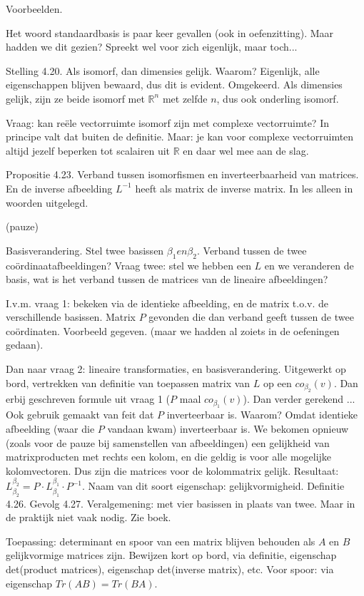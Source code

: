 \documentclass{article}
\begin{document}
Voorbeelden. 

Het woord standaardbasis is paar keer gevallen (ook in oefenzitting). Maar hadden we dit gezien? Spreekt wel voor zich eigenlijk, maar toch... 

Stelling 4.20. Als isomorf, dan dimensies gelijk. Waarom? Eigenlijk, alle eigenschappen blijven bewaard, dus dit is evident. Omgekeerd. Als dimensies gelijk, zijn ze beide isomorf met $\mathbb{R}^n$ met zelfde $n$, dus ook onderling isomorf. 

Vraag: kan re\"ele vectorruimte isomorf zijn met complexe vectorruimte? In principe valt dat buiten de definitie. Maar: je kan voor complexe vectorruimten altijd jezelf beperken tot scalairen uit $\mathbb{R}$ en daar wel mee aan de slag.

Propositie 4.23. Verband tussen isomorfismen en inverteerbaarheid van matrices. En de inverse afbeelding $L^{-1}$ heeft als matrix de inverse matrix. In les alleen in woorden uitgelegd. 

(pauze) 

Basisverandering. Stel twee basissen $\beta_1 en \beta_2$. Verband tussen de twee co\-\"or\-di\-naat\-afbeeldingen? Vraag twee: stel we hebben een $L$ en we veranderen de basis, wat is het verband tussen de matrices van de lineaire afbeeldingen? 

I.v.m. vraag 1: bekeken via de identieke afbeelding, en de matrix t.o.v. de verschillende basissen. Matrix $P$ gevonden die dan verband geeft tussen de twee co\"ordinaten. Voorbeeld gegeven. (maar we hadden al zoiets in de oefeningen gedaan). 

Dan naar vraag 2: lineaire transformaties, en basisverandering. Uitgewerkt op bord, vertrekken van definitie van toepassen matrix van $L$ op een $co_{\beta_2}(v)$. Dan erbij geschreven formule uit vraag 1 ($P$ maal $co_{\beta_1}(v)$). Dan verder gerekend ... Ook gebruik gemaakt van feit dat $P$ inverteerbaar is. Waarom? Omdat identieke afbeelding (waar die $P$ vandaan kwam) inverteerbaar is. We bekomen opnieuw (zoals voor de pauze bij samenstellen van afbeeldingen) een gelijkheid van matrixproducten met rechts een kolom, en die geldig is voor alle mogelijke kolomvectoren. Dus zijn die matrices voor de kolommatrix gelijk. Resultaat: $L_{\beta_2}^{\beta_2}  = P \cdot L_{\beta_1}^{\beta_1} \cdot P^{-1}$. Naam van dit soort eigenschap: gelijkvormigheid. Definitie 4.26. Gevolg 4.27. 
Veralgemening: met vier basissen in plaats van twee. Maar in de praktijk niet vaak nodig. Zie boek. 

Toepassing: determinant en spoor van een matrix blijven behouden als $A$ en $B$ gelijkvormige matrices zijn. Bewijzen kort op bord, via definitie, eigenschap det(product matrices), eigenschap det(inverse matrix), etc. Voor spoor: via eigenschap $Tr(AB)=Tr(BA)$. 
\end{document}
